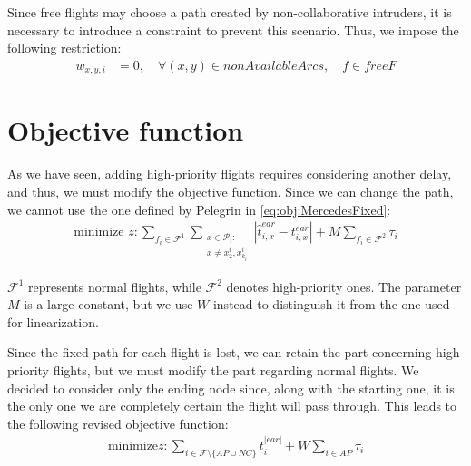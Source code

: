 \documentclass[../thesis.tex]{subfiles}
\begin{document}
Since free flights may choose a path created by non-collaborative intruders, it is necessary to introduce a constraint to prevent this scenario.  
Thus, we impose the following restriction:
\begin{align}
    w_{x,y,i} & = 0, \quad \forall (x,y) \in nonAvailableArcs, \quad f \in freeF
    \label{eq:constrain:avoidShortcut}
\end{align}


\section{Objective function}
As we have seen, adding high-priority flights requires considering another delay, and thus, we must modify the objective function.  
Since we can change the path, we cannot use the one defined by Pelegrin in \eqref{eq:obj:MercedesFixed}:  
\begin{align}\label{eq:obj:MercedesFixed}
\text{minimize } z:\sum_{f_i \in \mathcal{F}^1} \sum_{\substack{x\in \mathcal{P}_i:\\ x\neq x^i_2,x_{k_i}^i }} |\hat{t}^{ear}_{i,x}-t^{ear}_{i,x}|
+ M\sum_{f_i\in \mathcal{F}^2}\tau_i
\end{align}

$\mathcal{F}^1$ represents normal flights, while $\mathcal{F}^2$ denotes high-priority ones. The parameter $M$ is a large constant, but we use $W$ instead to distinguish it from the one used for linearization.

Since the fixed path for each flight is lost, we can retain the part concerning high-priority flights, but we must modify the part regarding normal flights.  
We decided to consider only the ending node since, along with the starting one, it is the only one we are completely certain the flight will pass through.  
This leads to the following revised objective function:  
\begin{align}\label{eq:obj:MercedesFree}
\text{minimize} z:\sum_{i \in \mathcal{F}\setminus\{AP\cup NC\}} t^{|ear|}_{i}+
W\sum_{i\in AP}\tau_i
\end{align}
\end{document}
